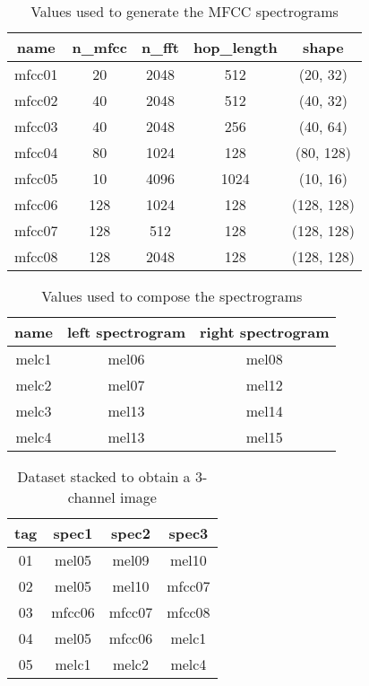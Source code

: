 \begin{table}[h!]
    \centering
    \caption{Values used to generate the MFCC spectrograms}
    \label{tab:mfcc_values}
    \begin{tabular}{|c|cccc|}
        \hline
        name & n\_mfcc & n\_fft & hop\_length & shape \\
        \hline
        mfcc01 & 20  & 2048 & 512  & (20, 32) \\
        mfcc02 & 40  & 2048 & 512  & (40, 32) \\
        mfcc03 & 40  & 2048 & 256  & (40, 64) \\
        mfcc04 & 80  & 1024 & 128  & (80, 128) \\
        mfcc05 & 10  & 4096 & 1024 & (10, 16) \\
        mfcc06 & 128 & 1024 & 128  & (128, 128) \\
        mfcc07 & 128 & 512  & 128  & (128, 128) \\
        mfcc08 & 128 & 2048 & 128  & (128, 128) \\
        \hline
    \end{tabular}
\end{table}

\begin{table}[h!]
    \centering
    \caption{Values used to compose the spectrograms}
    \label{tab:compose_values}
    \begin{tabular}{|c|cc|}
        \hline
        name & left spectrogram & right spectrogram \\
        \hline
        melc1 & mel06 & mel08 \\
        melc2 & mel07 & mel12 \\
        melc3 & mel13 & mel14 \\
        melc4 & mel13 & mel15 \\
        \hline
    \end{tabular}
\end{table}

\begin{table}[h!]
    \centering
    \caption{Dataset stacked to obtain a 3-channel image}
    \label{tab:ch3_values}
    \begin{tabular}{|c|ccc|}
        \hline
        tag & spec1 & spec2 & spec3 \\
        \hline
        01 & mel05  & mel09  & mel10 \\
        02 & mel05  & mel10  & mfcc07 \\
        03 & mfcc06 & mfcc07 & mfcc08 \\
        04 & mel05  & mfcc06 & melc1 \\
        05 & melc1  & melc2  & melc4 \\
        \hline
    \end{tabular}
\end{table}

